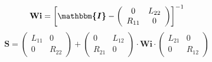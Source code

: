 \[ \mathbf{Wi} =  \left[ \boldsymbol{\mathbbm{I}}  -
\left(\begin{array}{cc} 0 & L_{22} \\ R_{11} & 0 \end{array}\right)
\right]^{-1}  \]
\[ \mathbf{S} = \left(\begin{array}{cc} L_{11} & 0 \\ 0 & R_{22}
\end{array}\right) + \left(\begin{array}{cc} 0 & L_{12} \\ R_{21} & 0
\end{array}\right) \cdot \mathbf{Wi} \cdot\left(\begin{array}{cc}
L_{21} & 0 \\ 0 & R_{12} \end{array}\right) \]
